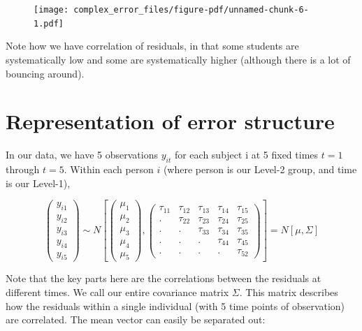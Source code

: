 \documentclass[
  letterpaper,
  DIV=11,
  numbers=noendperiod]{scrreprt}
\begin{document}
\begin{figure}[H]

{\centering \texttt{[image: complex\_error\_files/figure-pdf/unnamed-chunk-6-1.pdf]}

}

\end{figure}

Note how we have correlation of residuals, in that some students are
systematically low and some are systematically higher (although there is
a lot of bouncing around).

\hypertarget{representation-of-error-structure}{%
\section{Representation of error
structure}\label{representation-of-error-structure}}

In our data, we have 5 observations \(y_{it}\) for each subject i at 5
fixed times \(t=1\) through \(t=5\). Within each person \(i\) (where
person is our Level-2 group, and time is our Level-1),

\[\begin{pmatrix}y_{i1}\\
y_{i2}\\
y_{i3}\\
y_{i4}\\
y_{i5}
\end{pmatrix} \sim N\left[\left(\begin{array}{c}
\mu_1\\
\mu_2\\
\mu_3\\
\mu_4\\
\mu_5
\end{array}\right),\left(\begin{array}{ccccc}
\tau_{11} & \tau_{12} & \tau_{13} & \tau_{14} & \tau_{15}\\
. & \tau_{22} & \tau_{23}& \tau_{24} & \tau_{25}\\
. & . & \tau_{33}& \tau_{34} & \tau_{35}\\
. & . & . & \tau_{44} & \tau_{45}\\
. & . & . & . & \tau_{52}
\end{array}\right)\right] = N[ \mu, \Sigma ]\]

Note that the key parts here are the correlations between the residuals
at different times. We call our entire covariance matrix \(\Sigma\).
This matrix describes how the residuals within a single individual (with
5 time points of observation) are correlated. The mean vector can easily
be separated out:
\end{document}
